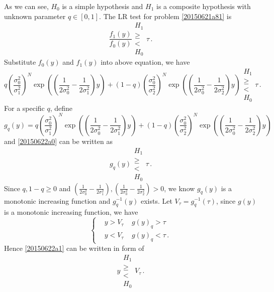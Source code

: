 As we can see, $H_0$ is a simple hypothesis and $H_1$ is a composite hypothesis with unknown parameter $q \in [0, 1]$. 
The LR test for problem  \eqref{20150621a81} is
\begin{equation}
  \frac{f_1(y)}{f_0(y)} \substack{H_1 \\ \geq \\ < \\ H_0} \tau\,.
\end{equation}
Substitute $f_0(y)$ and $f_1(y)$ into above equation, we have 
\begin{equation}
  q\left(\frac{\sigma_0^2}{\sigma_1^2}\right)^N\exp\left( (\frac{1}{2\sigma_0^2} -  \frac{1}{2\sigma_1^2}  )y \right)
+ (1-q) \left(\frac{\sigma_0^2}{\sigma_2^2}\right)^N\exp\left( (\frac{1}{2\sigma_0^2} -  \frac{1}{2\sigma_2^2}  )y \right)
\substack{H_1 \\ \geq \\ < \\ H_0} \tau\,.
\label{20150622a0}
\end{equation}
For a specific $q$, define 
\begin{equation}
  g_q(y) = q\left(\frac{\sigma_0^2}{\sigma_1^2}\right)^N\exp\left( (\frac{1}{2\sigma_0^2} -  \frac{1}{2\sigma_1^2}  )y \right)
+ (1-q) \left(\frac{\sigma_0^2}{\sigma_2^2}\right)^N\exp\left( (\frac{1}{2\sigma_0^2} -  \frac{1}{2\sigma_2^2}  )y \right)\,
\end{equation}
and \eqref{20150622a0} can be written as
\begin{equation}
  g_q(y) \substack{H_1 \\ \geq \\ < \\ H_0} \tau\,.
  \label{20150622a1}
\end{equation}
Since $q, 1-q \geq 0$ and $(\frac{1}{2\sigma_0^2} -  \frac{1}{2\sigma_1^2}  ), (\frac{1}{2\sigma_0^2} -  \frac{1}{2\sigma_2^2}  ) >  0$, we know $g_q(y)$ is a monotonic increasing function and $g^{-1}_q(y) $ exists.  
Let $V_\tau = g^{-1}_q(\tau)$, since $g(y)$ is a monotonic increasing function, we have 
\begin{equation}
  \begin{cases}
    &y > V_\tau\;\;\;\;g(y)_q > \tau\\
    &y < V_\tau\;\;\;\;g(y)_q < \tau\,.
  \end{cases}
\end{equation}
Hence \eqref{20150622a1} can be written in form of 
\begin{equation}
  y  \substack{H_1 \\ \geq \\ < \\ H_0} V_\tau\,.
  \label{20150622a2}
\end{equation}

